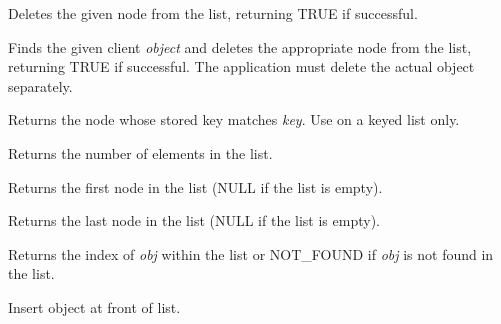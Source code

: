 {\label{wxlistdeletenode}


Deletes the given node from the list, returning TRUE if successful.

\label{wxlistdeleteobject}


Finds the given client {\it object} and deletes the appropriate node from the list, returning
TRUE if successful. The application must delete the actual object separately.

\label{wxlistfind}



Returns the node whose stored key matches {\it key}. Use on a keyed list only.

\label{wxlistgetcount}


Returns the number of elements in the list.

\label{wxlistgetfirst}


Returns the first node in the list (NULL if the list is empty).

\label{wxlistgetlast}


Returns the last node in the list (NULL if the list is empty).

\label{wxlistindexof}


Returns the index of {\it obj} within the list or NOT\_FOUND if {\it obj} 
is not found in the list.

\label{wxlistinsert}


Insert object at front of list.


}
